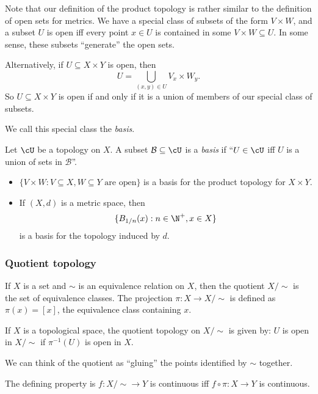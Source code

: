 \documentclass[a4paper]{article}
\begin{document}
Note that our definition of the product topology is rather similar to the definition of open sets for metrics. We have a special class of subsets of the form $V\times W$, and a subset $U$ is open iff every point $x\in U$ is contained in some $V\times W\subseteq U$. In some sense, these subsets ``generate'' the open sets.

Alternatively, if $U\subseteq X\times Y$ is open, then
\[
  U = \bigcup_{(x, y)\in U} V_x\times W_y.
\]
So $U\subseteq X\times Y$ is open if and only if it is a union of members of our special class of subsets.

We call this special class the \emph{basis}.

\begin{defi}[Basis]
  Let $\cU$ be a topology on $X$. A subset $\mathcal{B} \subseteq \cU$ is a \emph{basis} if ``$U\in \cU$ iff $U$ is a union of sets in $\mathcal{B}$''.
\end{defi}

\begin{eg}\leavevmode
  \begin{itemize}
    \item $\{V\times W: V\subseteq X, W\subseteq Y\text{ are open}\}$ is a basis for the product topology for $X\times Y$.
    \item If $(X, d)$ is a metric space, then
      \[
        \{B_{1/n}(x): n\in \N^+, x\in X\}
      \]
      is a basis for the topology induced by $d$.
  \end{itemize}
\end{eg}

\subsubsection{Quotient topology}
If $X$ is a set and $\sim$ is an equivalence relation on $X$, then the quotient $X/{\sim}$ is the set of equivalence classes. The projection $\pi: X\to X/{\sim}$ is defined as $\pi(x) = [x]$, the equivalence class containing $x$.

\begin{defi}
  If $X$ is a topological space, the quotient topology on $X/{\sim}$ is given by: $U$ is open in $X/{\sim}$ if $\pi^{-1}(U)$ is open in $X$.
\end{defi}
We can think of the quotient as ``gluing'' the points identified by $\sim$ together.

The defining property is $f: X/{\sim} \to Y$ is continuous iff $f\circ \pi: X\to Y$ is continuous.
\end{document}
